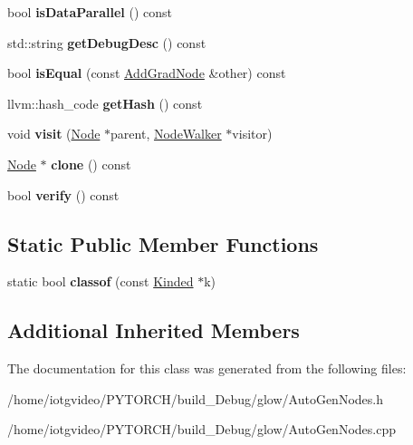 \begin{DoxyCompactItemize}
bool {\bfseries is\+Data\+Parallel} () const
\item 
\mbox{\label{classglow_1_1_add_grad_node_a8f19f944c711582acd56e495b2544fcc}} 
std\+::string {\bfseries get\+Debug\+Desc} () const
\item 
\mbox{\label{classglow_1_1_add_grad_node_ae5bec2ff5872db4e9c08c9b5a2600f2e}} 
bool {\bfseries is\+Equal} (const \hyperlink{classglow_1_1_add_grad_node}{Add\+Grad\+Node} \&other) const
\item 
\mbox{\label{classglow_1_1_add_grad_node_a545d9fb26232588d25ab7ddc39505d1a}} 
llvm\+::hash\+\_\+code {\bfseries get\+Hash} () const
\item 
\mbox{\label{classglow_1_1_add_grad_node_a77c2b481d9748028e0b159e6ec90aee6}} 
void {\bfseries visit} (\hyperlink{classglow_1_1_node}{Node} $\ast$parent, \hyperlink{classglow_1_1_node_walker}{Node\+Walker} $\ast$visitor)
\item 
\mbox{\label{classglow_1_1_add_grad_node_a68cd96c381857a65a317e74629d22d63}} 
\hyperlink{classglow_1_1_node}{Node} $\ast$ {\bfseries clone} () const
\item 
\mbox{\label{classglow_1_1_add_grad_node_ab9957d4bc383547e2163b0ecf9e4c7d7}} 
bool {\bfseries verify} () const
\end{DoxyCompactItemize}
\subsection*{Static Public Member Functions}
\begin{DoxyCompactItemize}
\item 
\mbox{\label{classglow_1_1_add_grad_node_ad0238eae8860274557604afeed0113e0}} 
static bool {\bfseries classof} (const \hyperlink{classglow_1_1_kinded}{Kinded} $\ast$k)
\end{DoxyCompactItemize}
\subsection*{Additional Inherited Members}


The documentation for this class was generated from the following files\+:\begin{DoxyCompactItemize}
\item 
/home/iotgvideo/\+P\+Y\+T\+O\+R\+C\+H/build\+\_\+\+Debug/glow/Auto\+Gen\+Nodes.\+h\item 
/home/iotgvideo/\+P\+Y\+T\+O\+R\+C\+H/build\+\_\+\+Debug/glow/Auto\+Gen\+Nodes.\+cpp\end{DoxyCompactItemize}
